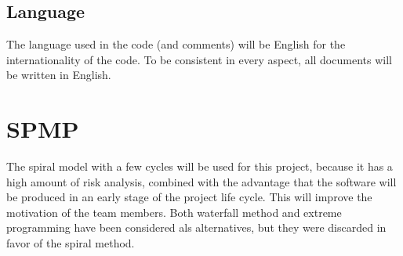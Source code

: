 \documentclass[a4paper, 12pt]{article}
\begin{document}
	\subsection{Language}
	The language used in the code (and comments) will be English for the internationality of the code. To be consistent in every aspect, all documents will be written in English.

	\section{SPMP}
	The spiral model with a few cycles will be used for this project, because it has a high amount of risk analysis, combined with the advantage that the software will be produced in an early stage of the project life cycle. This will improve the motivation of the team members. Both waterfall method and extreme programming have been considered als alternatives, but they were discarded in favor of the spiral method.
\end{document}

